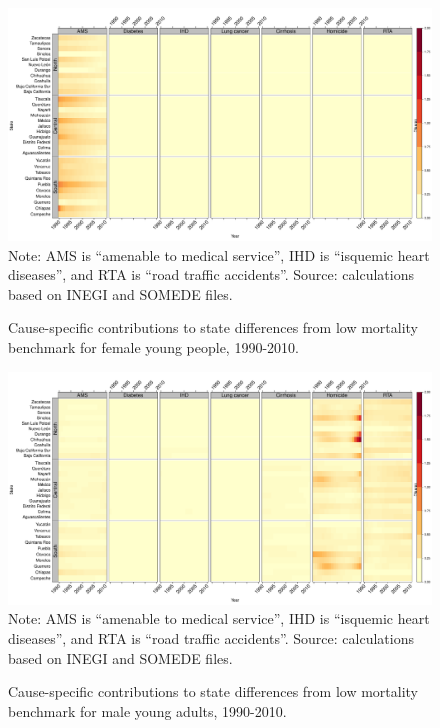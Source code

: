 \documentclass[11.5pt]{article}
\begin{document}
{\begin{figure}
\centering
\caption{Cause-specific contributions to state differences from low mortality benchmark for female young people, 1990-2010.}
\label{fig:e0_14_females}
\includegraphics[scale=.3]{Figures/Young_Female_heatmap.pdf}
Note: AMS is ``amenable to medical service'', IHD is ``isquemic heart diseases'', and RTA is ``road traffic accidents''. Source: calculations based on INEGI and SOMEDE files. \end{figure}



\begin{figure}
\centering
\caption{Cause-specific contributions to state differences from low mortality benchmark for male young adults, 1990-2010.}
\label{fig:e15_39_males}
\includegraphics[scale=.3]{Figures/YoungAdult_Male_heatmap.pdf}
Note: AMS is ``amenable to medical service'', IHD is ``isquemic heart diseases'', and RTA is ``road traffic accidents''. Source: calculations based on INEGI and SOMEDE files.
\end{figure}

}
\end{document}
